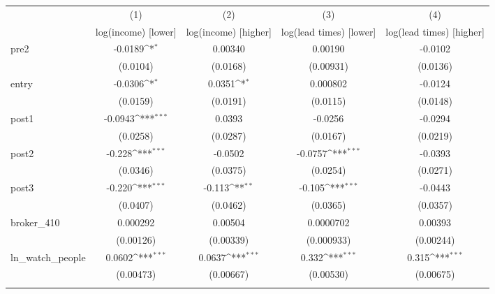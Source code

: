 {
\def\sym#1{\ifmmode^{#1}\else\(^{#1}\)\fi}
\begin{tabular}{l*{4}{c}}
\toprule
            &\multicolumn{1}{c}{(1)}&\multicolumn{1}{c}{(2)}&\multicolumn{1}{c}{(3)}&\multicolumn{1}{c}{(4)}\\
            &\multicolumn{1}{c}{log(income) [lower]}&\multicolumn{1}{c}{log(income) [higher]}&\multicolumn{1}{c}{log(lead times) [lower]}&\multicolumn{1}{c}{log(lead times) [higher]}\\
\midrule
pre2        &     -0.0189\sym{*}  &     0.00340         &     0.00190         &     -0.0102         \\
            &    (0.0104)         &    (0.0168)         &   (0.00931)         &    (0.0136)         \\
\addlinespace
entry       &     -0.0306\sym{*}  &      0.0351\sym{*}  &    0.000802         &     -0.0124         \\
            &    (0.0159)         &    (0.0191)         &    (0.0115)         &    (0.0148)         \\
\addlinespace
post1       &     -0.0943\sym{***}&      0.0393         &     -0.0256         &     -0.0294         \\
            &    (0.0258)         &    (0.0287)         &    (0.0167)         &    (0.0219)         \\
\addlinespace
post2       &      -0.228\sym{***}&     -0.0502         &     -0.0757\sym{***}&     -0.0393         \\
            &    (0.0346)         &    (0.0375)         &    (0.0254)         &    (0.0271)         \\
\addlinespace
post3       &      -0.220\sym{***}&      -0.113\sym{**} &      -0.105\sym{***}&     -0.0443         \\
            &    (0.0407)         &    (0.0462)         &    (0.0365)         &    (0.0357)         \\
\addlinespace
broker\_410  &    0.000292         &     0.00504         &   0.0000702         &     0.00393         \\
            &   (0.00126)         &   (0.00339)         &  (0.000933)         &   (0.00244)         \\
\addlinespace
ln\_watch\_people&      0.0602\sym{***}&      0.0637\sym{***}&       0.332\sym{***}&       0.315\sym{***}\\
            &   (0.00473)         &   (0.00667)         &   (0.00530)         &   (0.00675)         \\
\addlinespace

\end{tabular}}
